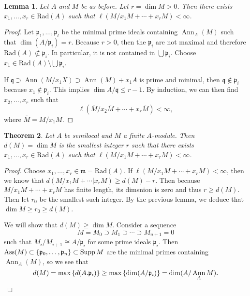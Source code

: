 \documentclass[leqno, openany]{memoir}
\newtheorem{thm}{Theorem}[section]
\newtheorem{lem}[thm]{Lemma}
\theoremstyle{definition}
\theoremstyle{remark}
\theoremstyle{plain}
\theoremstyle{definition}
\theoremstyle{remark}
\newcommand{\mf}[1]{\mathfrak{#1}}
\newcommand{\mr}[1]{\mathrm{#1}}
\newcommand{\ol}[1]{\overline{#1}}
\DeclareMathOperator{\Ann}{Ann}
\DeclareMathOperator{\Ass}{Ass}
\begin{document}
\begin{lem} Let $A$ and $M$ be as before. Let $r = \dim M > 0$. Then there
exists $x_1, \ldots, x_r \in \mr{Rad}(A)$ such that $\ell(M / x_1 M + \cdots +
x_r M) < \infty$.  \end{lem}

\begin{proof} Let $\mf{p}_1, \ldots, \mf{p}_t$ be the minimal prime ideals
    containing $\Ann_A(M)$ such that $\dim(A/\mf{p}_i) = r$. Because $r > 0$,
    then the $\mf{p}_i$ are not maximal and therefore $\mr{Rad}(A) \not\subset
    \mf{p}_i$. In particular, it is not contained in $\bigcup \mf{p}_i$. Choose
    $x_1 \in \mr{Rad}(A) \setminus \bigcup \mf{p}_i$.

    If $\mf{q} \supset \Ann(M / x_1 X) \supset \Ann(M) + x_1A$ is prime and
    minimal, then $\mf{q} \notin \mf{p}_i$ because $x_1 \notin \mf{p}_i$. This
    implies $\dim A/\mf{q} \leq r-1$. By induction, we can then find $x_2,
    \ldots, x_r$ such that \[ \ell(\ol{M} / x_2 \ol{M} + \cdots + x_r \ol{M}) <
    \infty, \] where $\ol{M} = M / x_1M$.  \end{proof}

\begin{thm} Let $A$ be semilocal and $M$ a finite $A$-module. Then $d(M) = \dim
M$ is the smallest integer $r$ such that there exists $x_1, \ldots, x_r \in
\mr{Rad}(A)$ such that $\ell(M / x_1 M + \cdots + x_r M) < \infty$.  \end{thm}

\begin{proof} Choose $x_1, \ldots, x_r \in \mf{m} = \mr{Rad}(A)$. If $\ell(M /
    x_1 M + \cdots + x_r M) < \infty$, then we know that $d(M / x_1 M + \cdots
    | x_r M) \geq d(M) - r$. Then because $M / x_1 M + \cdots + x_r M$ has
    finite length, its dimsnion is zero and thus $r \geq d(M)$. Then let $r_0$
    be the smallest such integer. By the previous lemma, we deduce that $\dim M
    \geq r_0 \geq d(M)$.

    We will show that $d(M) \geq \dim M$. Consider a sequence \[ M = M_0
    \supset M_1 \supset \cdots \supset M_{n+1} = 0 \] such that $M_i / M_{i+1}
    \cong A / \mf{p}_i$ for some prime ideals $\mf{p}_i$. Then $\Ass(M) \subset
    \qty{ \mf{p}_0, \ldots, \mf{p}_n } \subset \operatorname{Supp} M$ are the
    minimal primes containing $\Ann_A(M)$, so we see that \[ d(M) = \max \qty{d
    ( A.\mf{p}_i )} \geq \max \qty{\dim (A / \mf{p}_i)} = \dim(A / \Ann_A M).
\qedhere \] \end{proof}
\end{document}
